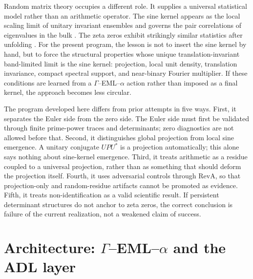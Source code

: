 \documentclass[11pt]{article}
\theoremstyle{definition}
\theoremstyle{plain}
\begin{document}
Random matrix theory occupies a different role.  It supplies a universal statistical model rather than an arithmetic operator.  The sine kernel appears as the local scaling limit of unitary invariant ensembles and governs the pair correlations of eigenvalues in the bulk \citep{Mehta2004,Forrester2010}.  The zeta zeros exhibit strikingly similar statistics after unfolding \citep{Montgomery1973,Odlyzko1987}.  For the present program, the lesson is not to insert the sine kernel by hand, but to force the structural properties whose unique translation-invariant band-limited limit is the sine kernel: projection, local unit density, translation invariance, compact spectral support, and near-binary Fourier multiplier.  If these conditions are learned from a $\Gamma$--EML--$\alpha$ action rather than imposed as a final kernel, the approach becomes less circular.

The program developed here differs from prior attempts in five ways.  First, it separates the Euler side from the zero side.  The Euler side must first be validated through finite prime-power traces and determinants; zero diagnostics are not allowed before that.  Second, it distinguishes global projection from local sine emergence.  A unitary conjugate $UPU^*$ is a projection automatically; this alone says nothing about sine-kernel emergence.  Third, it treats arithmetic as a residue coupled to a universal projection, rather than as something that should deform the projection itself.  Fourth, it uses adversarial controls through RevA, so that projection-only and random-residue artifacts cannot be promoted as evidence.  Fifth, it treats non-identification as a valid scientific result.  If persistent determinant structures do not anchor to zeta zeros, the correct conclusion is failure of the current realization, not a weakened claim of success.

\section{Architecture: $\Gamma$--EML--$\alpha$ and the ADL layer}
\end{document}
